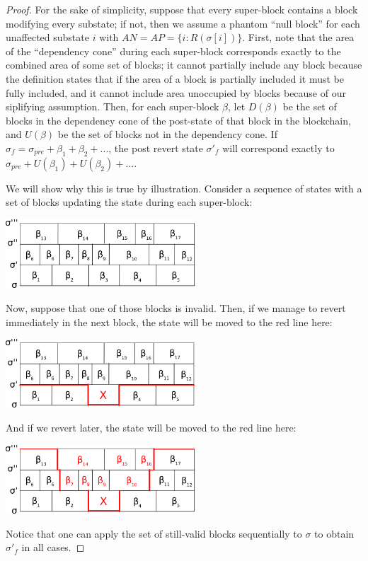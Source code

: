 \documentclass[11pt,a4paper]{report}
\theoremstyle{plain}
\theoremstyle{definition}
\theoremstyle{remark}
\begin{document}
\begin{proof}
For the sake of simplicity, suppose that every super-block contains a block modifying every substate; if not, then we assume a phantom ``null block'' for each unaffected substate $i$ with $AN = AP = \{i: R(\sigma[i])\}$. First, note that the area of the ``dependency cone'' during each super-block corresponds exactly to the combined area of some set of blocks; it cannot partially include any block because the definition states that if the area of a block is partially included it must be fully included, and it cannot include area unoccupied by blocks because of our siplifying assumption. Then, for each super-block $\beta$, let $D(\beta)$ be the set of blocks in the dependency cone of the post-state of that block in the blockchain, and $U(\beta)$ be the set of blocks not in the dependency cone. If $\sigma_f = \sigma_{pre} + \beta_1 + \beta_2 + ...$, the post revert state $\sigma'_f$ will correspond exactly to $\sigma_{pre} + U(\beta_1) + U(\beta_2) + ...$. 

We will show why this is true by illustration. Consider a sequence of states with a set of blocks updating the state during each super-block:

\begin{center}
\includegraphics[width=200pt]{revert1.png}
\end{center}

Now, suppose that one of those blocks is invalid. Then, if we manage to revert immediately in the next block, the state will be moved to the red line here:

\begin{center}
\includegraphics[width=200pt]{revert2.png}
\end{center}

And if we revert later, the state will be moved to the red line here:

\begin{center}
\includegraphics[width=200pt]{revert3.png}
\end{center}

Notice that one can apply the set of still-valid blocks sequentially to $\sigma$ to obtain $\sigma'_f$ in all cases.
\end{proof}
\end{document}
